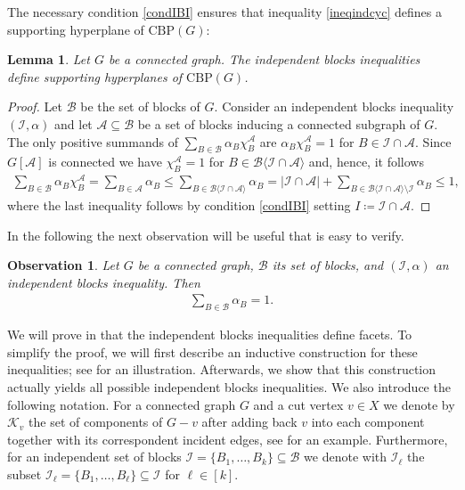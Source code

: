 \documentclass[12pt]{amsart}
\newtheorem{lemma}[theorem]{Lemma}
\newtheorem{observation}[theorem]{Observation}
\newcommand{\CBP}{\mathrm{CBP}}
\newcommand{\K}{\mathcal{K}}
\newcommand{\I}{\mathcal{I}}
\newcommand{\B}{\mathcal{B}}
\newcommand{\A}{\mathcal{A}}
\newcommand{\Xr}[1]{}
\newcommand{\Xn}[1]{{\protect#1}}
\begin{document}
\Xr{Generally, t}\Xn{T}he necessary condition \eqref{condIBI} ensures that inequality \eqref{ineqindcyc} defines a supporting hyperplane of $\CBP(G)$:

\begin{lemma}
    Let $G$ be a connected graph. The independent blocks inequalities define supporting hyperplanes of $\CBP(G)$.
    \label{supporting}
\end{lemma}

\begin{proof}
    Let $\B$ be the set of blocks of $G$. Consider an independent blocks inequality $(\I,\alpha)$ and let $\A \subseteq \B$ be a set of blocks inducing a connected subgraph of $G$. The only positive summands of $\sum_{B \in \B}\alpha_B\chi_B^\A$ are $\alpha_B\chi_B^\A=1$ for $B \in \I \cap \A$. Since $G[\A]$ is connected we have $\chi^\A_B=1$ for $B \in \B\langle \I \cap \A \rangle$ and, hence, it follows
\begin{align*}
    \sum_{B \in \B}\alpha_B \chi^\A_B =\sum_{B \in \A}\alpha_B \le \sum_{B \in \B\langle \I \cap \A\rangle}\alpha_B = \vert \I \cap \A\vert+\sum_{B \in \B\langle \I \cap \A\rangle \setminus \I}\alpha_B \le 1,
\end{align*}
where the last inequality follows by condition \eqref{condIBI} setting $I \coloneqq \I \cap \A$.
\end{proof}

In the following the next observation will be useful that is easy to verify.

\begin{observation}
    \label{sum=1}
    Let $G$ be a connected graph, $\B$ its set of blocks, and $(\I,\alpha)$ an independent blocks inequality. Then
    \begin{align*}
        \sum_{B \in \B}\alpha_B=1.
    \end{align*}
\end{observation}

We will prove in  that the independent blocks inequalities define facets. To simplify the proof, we will first describe an inductive construction for these inequalities; see  for an illustration. Afterwards, we show that this construction actually yields all possible independent blocks inequalities. We also introduce the following notation. For a connected graph $G$ and a cut vertex $v \in X$ we denote by $\K_v$ the set of components of $G-v$ after adding back $v$ into each component together with its correspondent incident edges\Xn{, see  for an example}. Furthermore, for an independent set of blocks $\I=\{B_1,\ldots,B_k\} \subseteq \B$ we denote with $\I_\ell$ the subset $\I_\ell=\{B_1,\ldots,B_\ell\} \subseteq \I$ for $\ell \in [k]$.
\end{document}
